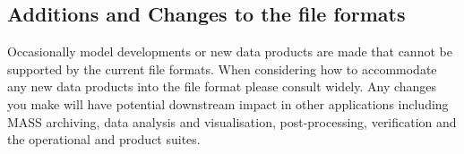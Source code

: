 \subsection{Additions and Changes to the file formats}

Occasionally model developments or new data products are made that cannot be supported by the current file formats. When considering how to accommodate any new data products into the file format please consult widely. Any changes you make will have potential downstream impact in other applications including MASS archiving, data analysis and visualisation, post-processing, verification and the operational and product suites.
